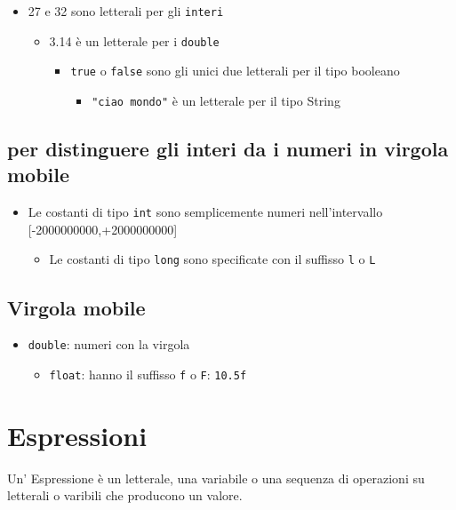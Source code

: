 \documentclass[11pt]{article}
\begin{document}
\begin{itemize}
\item 27 e 32 sono letterali per gli \texttt{interi}
\begin{itemize}
\item 3.14 è un letterale per i \texttt{double}
\begin{itemize}
\item \texttt{true} o \texttt{false} sono gli unici due letterali per il tipo booleano
\begin{itemize}
\item \texttt{"ciao mondo"} è un letterale per il tipo String
\end{itemize}
\end{itemize}
\end{itemize}
\end{itemize}
\subsection{per distinguere gli interi da i numeri in virgola mobile}
\label{sec:org02a2479}
\begin{itemize}
\item Le costanti di tipo \texttt{int} sono semplicemente numeri nell'intervallo [-2000000000,+2000000000]
\begin{itemize}
\item Le costanti di tipo \texttt{long} sono specificate con il suffisso \texttt{l} o \texttt{L}
\end{itemize}
\end{itemize}
\subsection{Virgola mobile}
\label{sec:orge819e1b}
\begin{itemize}
\item \texttt{double}: numeri con la virgola
\begin{itemize}
\item \texttt{float}: hanno il suffisso \texttt{f} o \texttt{F}: \texttt{10.5f}
\end{itemize}
\end{itemize}
\section{Espressioni}
\label{sec:orgb103d47}
Un' Espressione è un letterale, una variabile o una sequenza di operazioni su letterali o varibili che producono un valore.
\end{document}
